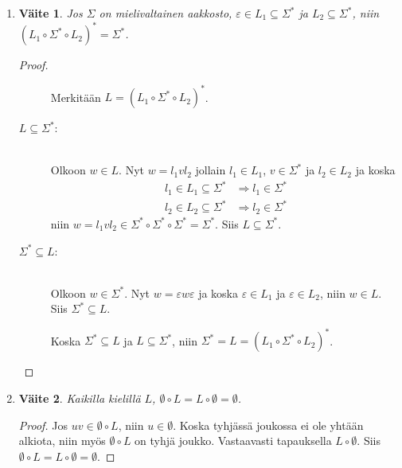 \documentclass[a4paper,11pt]{article}
\newtheorem*{vaite}{Väite}
\begin{document}
\begin{enumerate}
\begin{enumerate}
  \item
    \begin{vaite}
      Jos $\Sigma$ on mielivaltainen aakkosto, $\varepsilon \in L_1
      \subseteq \Sigma^*$ ja $L_2 \subseteq \Sigma^*$, niin $(L_1
      \circ \Sigma^* \circ L_2)^* = \Sigma^*$.
    \end{vaite}
    \begin{proof}
      \begin{description}
        \item[]Merkitään $L = (L_1 \circ \Sigma^* \circ L_2)^*$.
        \item[$L \subseteq \Sigma^*$:]
          \hfill \\
          Olkoon $w \in L$. Nyt $w = l_1vl_2$ jollain $l_1 \in L_1$,
          $v \in \Sigma^*$ ja $l_2 \in L_2$ ja koska
          \begin{align*}
            l_1 \in L_1 \subseteq \Sigma^* &\Rightarrow l_1 \in
            \Sigma^* \\
            l_2 \in L_2 \subseteq \Sigma^* &\Rightarrow l_2 \in
            \Sigma^*
          \end{align*}
          niin $w = l_1vl_2 \in \Sigma^* \circ \Sigma^* \circ \Sigma^*
          = \Sigma^*$. Siis $L \subseteq \Sigma^*$.
        \item[$\Sigma^* \subseteq L$:]
          \hfill \\
          Olkoon $w \in \Sigma^*$. Nyt $w = \varepsilon w \varepsilon$
          ja koska $\varepsilon \in L_1$ ja $\varepsilon \in L_2$,
          niin $w \in L$. Siis $\Sigma^* \subseteq L$.
        \item[]Koska $\Sigma^* \subseteq L$ ja $L \subseteq
          \Sigma^*$, niin $\Sigma^* = L = (L_1 \circ \Sigma^* \circ
          L_2)^*$.
      \end{description}
    \end{proof}

  \item
    \begin{vaite}
      Kaikilla kielillä $L$, $\emptyset \circ L = L \circ \emptyset = \emptyset$.
    \end{vaite}
    \begin{proof}
      Jos $uv \in \emptyset \circ L$, niin $u \in \emptyset$. Koska
      tyhjässä joukossa ei ole yhtään alkiota, niin myös $\emptyset
      \circ L$ on tyhjä joukko. Vastaavasti tapauksella $L \circ
      \emptyset$. Siis $\emptyset \circ L = L \circ \emptyset =
      \emptyset$.
    \end{proof}
  \end{enumerate}


\end{enumerate}
\end{document}
